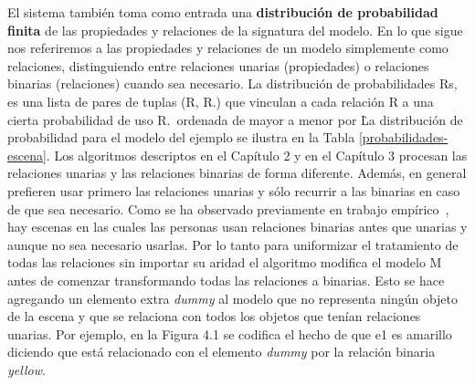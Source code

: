 El sistema tambi\'en toma como entrada una \textbf{distribuci\'on de probabilidad finita} de las propiedades y relaciones de la signatura del modelo. En lo que sigue nos referiremos a las propiedades y relaciones de un modelo simplemente como relaciones, distinguiendo entre relaciones unarias (propiedades) o relaciones binarias (relaciones) cuando sea necesario. La distribuci\'on de probabilidades Rs, es una lista de pares de tuplas (R, R.\puse) que vinculan a cada relaci\'on R a una cierta probabilidad de uso R.\puse\ ordenada de mayor a menor por \puse\. La distribuci\'on de probabilidad para el modelo del ejemplo se ilustra en la Tabla \ref{probabilidades-escena}.  Los algoritmos descriptos en el Cap\'itulo 2 y en el Cap\'itulo 3 procesan las relaciones unarias y las relaciones binarias de forma diferente. Adem\'as, en general prefieren usar primero las relaciones unarias y s\'olo recurrir a las binarias en caso de que sea necesario. Como se ha observado previamente en trabajo emp\'irico~\cite{tesisviethen}, hay escenas en las cuales las personas usan relaciones binarias antes que unarias y aunque no sea necesario usarlas. Por lo tanto para uniformizar el tratamiento de todas las relaciones sin importar su aridad el algoritmo modifica el modelo M antes de comenzar transformando todas las relaciones a binarias. Esto se hace agregando un elemento extra \emph{dummy} al modelo que no representa ning\'un objeto de la escena y que se relaciona con todos los objetos que ten\'ian relaciones unarias. Por ejemplo, en la Figura 4.1 se codifica el hecho de que e1 es amarillo diciendo que est\'a relacionado con el elemento \emph{dummy} por la relaci\'on binaria \emph{yellow}. 

